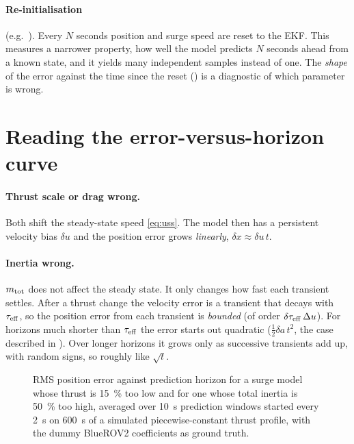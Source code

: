 \paragraph{Re-initialisation} (e.g.\ ). Every $N$ seconds position and surge speed
are reset to the EKF. This measures a narrower property, how well the model predicts $N$
seconds ahead from a known state, and it yields many independent samples instead of one. The
\emph{shape} of the error against the time since the reset () is a
diagnostic of which parameter is wrong.

\section{Reading the error-versus-horizon curve}

\paragraph{Thrust scale or drag wrong.} Both shift the steady-state speed \eqref{eq:uss}. The
model then has a persistent velocity bias $\delta u$ and the position error grows
\emph{linearly}, $\delta x \approx \delta u\,t$.

\paragraph{Inertia wrong.} $m_\mathrm{tot}$ does not affect the steady state. It only changes how fast
each transient settles. After a thrust change the velocity error is a transient that decays
with $\tau_\mathrm{eff}$, so the position error from each transient is \emph{bounded} (of order
$\delta\tau_\mathrm{eff}\,\Delta u$). For horizons much shorter than $\tau_\mathrm{eff}$ the error starts out
quadratic ($\tfrac12\delta a\,t^2$, the case described in ). Over longer
horizons it grows only as successive transients add up, with random signs, so roughly like
$\sqrt t$.

\begin{figure}[htbp]
\centering
{}
\caption{RMS position error against prediction horizon for a surge model whose thrust is
\qty{15}{\percent} too low and for one whose total inertia is \qty{50}{\percent} too high,
averaged over \qty{10}{\second} prediction windows started every \qty{2}{\second} on
\qty{600}{\second} of a simulated
piecewise-constant thrust profile, with the dummy BlueROV2 coefficients as ground truth.}
\label{fig:horizon}
\end{figure}
\FloatBarrier

